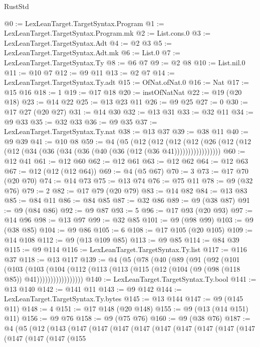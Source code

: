 \begin{lexlean}{RustStd}
\begin{coremodule}
@0 := LexLeanTarget.TargetSyntax.Program
@1 := LexLeanTarget.TargetSyntax.Program.mk
@2 := List.cons.{0}
@3 := LexLeanTarget.TargetSyntax.Adt
@4 := @2 @3
@5 := LexLeanTarget.TargetSyntax.Adt.mk
@6 := List.{0}
@7 := LexLeanTarget.TargetSyntax.Ty
@8 := @6 @7
@9 := @2 @8
@10 := List.nil.{0}
@11 := @10 @7
@12 := @9 @11
@13 := @2 @7
@14 := LexLeanTarget.TargetSyntax.Ty.adt
@15 := OfNat.ofNat.{0}
@16 := Nat
@17 := @15 @16
@18 := 1
@19 := @17 @18
@20 := instOfNatNat
@22 := @19 (@20 @18)
@23 := @14 @22
@25 := @13 @23 @11
@26 := @9 @25
@27 := 0
@30 := @17 @27 (@20 @27)
@31 := @14 @30
@32 := @13 @31
@33 := @32 @11
@34 := @9 @33
@35 := @32 @33
@36 := @9 @35
@37 := LexLeanTarget.TargetSyntax.Ty.nat
@38 := @13 @37
@39 := @38 @11
@40 := @9 @39
@41 := @10 @8
@59 := @4
    (@5
      (@12
        (@12
          (@12 (@12 (@26 (@12 (@12 (@12 (@34 (@36 (@34 (@36 (@40 (@36 (@12 (@36 @41)))))))))))))))))
@60 := @12 @41
@61 := @12 @60
@62 := @12 @61
@63 := @12 @62
@64 := @12 @63
@67 := @12 (@12 (@12 @64))
@69 := @4 (@5 @67)
@70 := 3
@73 := @17 @70 (@20 @70)
@74 := @14 @73
@75 := @13 @74
@76 := @75 @11
@78 := @9 (@32 @76)
@79 := 2
@82 := @17 @79 (@20 @79)
@83 := @14 @82
@84 := @13 @83
@85 := @84 @11
@86 := @84 @85
@87 := @32 @86
@89 := @9 (@38 @87)
@91 := @9 (@84 @86)
@92 := @9 @87
@93 := 5
@96 := @17 @93 (@20 @93)
@97 := @14 @96
@98 := @13 @97
@99 := @32 @85
@101 := @9 (@98 @99)
@103 := @9 (@38 @85)
@104 := @9 @86
@105 := 6
@108 := @17 @105 (@20 @105)
@109 := @14 @108
@112 := @9 (@13 @109 @85)
@113 := @9 @85
@114 := @84 @39
@115 := @9 @114
@116 := LexLeanTarget.TargetSyntax.Ty.list
@117 := @116 @37
@118 := @13 @117
@139 := @4
    (@5
      (@78
        (@40
          (@89
            (@91
              (@92
                (@101
                  (@103
                    (@103
                      (@104
                        (@112 (@113 (@113 (@115 (@12 (@104 (@9 (@98 (@118 @85)) @41)))))))))))))))))
@140 := LexLeanTarget.TargetSyntax.Ty.bool
@141 := @13 @140
@142 := @141 @11
@143 := @9 @142
@144 := LexLeanTarget.TargetSyntax.Ty.bytes
@145 := @13 @144
@147 := @9 (@145 @11)
@148 := 4
@151 := @17 @148 (@20 @148)
@155 := @9 (@13 (@14 @151) @11)
@156 := @9 @76
@158 := @9 (@75 @76)
@160 := @9 (@38 @76)
@187 := @4
    (@5
      (@12
        (@143
          (@147
            (@147
              (@147
                (@147
                  (@147
                    (@147
                      (@147
                        (@147
                          (@147
                            (@147
                              (@147
                                (@147
                                  (@155

\end{coremodule}
\end{lexlean}

